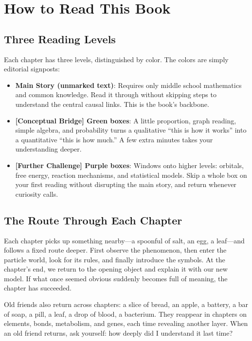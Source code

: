 \chapter*{How to Read This Book}

\section*{Three Reading Levels}

Each chapter has three levels, distinguished by color. The colors are simply editorial signposts:

\begin{itemize}[itemsep=4pt]
\item \textbf{Main Story (unmarked text)}: Requires only middle school mathematics and common knowledge. Read it through without skipping steps to understand the central causal links. This is the book's backbone.
\item \textbf{[Conceptual Bridge] Green boxes}: A little proportion, graph reading, simple algebra, and probability turns a qualitative ``this is how it works'' into a quantitative ``this is how much.'' A few extra minutes takes your understanding deeper.
\item \textbf{[Further Challenge] Purple boxes}: Windows onto higher levels: orbitals, free energy, reaction mechanisms, and statistical models. Skip a whole box on your first reading without disrupting the main story, and return whenever curiosity calls.
\end{itemize}

\section*{The Route Through Each Chapter}

Each chapter picks up something nearby---a spoonful of salt, an egg, a leaf---and follows a fixed route deeper. First observe the phenomenon, then enter the particle world, look for its rules, and finally introduce the symbols. At the chapter's end, we return to the opening object and explain it with our new model. If what once seemed obvious suddenly becomes full of meaning, the chapter has succeeded.

Old friends also return across chapters: a slice of bread, an apple, a battery, a bar of soap, a pill, a leaf, a drop of blood, a bacterium. They reappear in chapters on elements, bonds, metabolism, and genes, each time revealing another layer. When an old friend returns, ask yourself: how deeply did I understand it last time?

